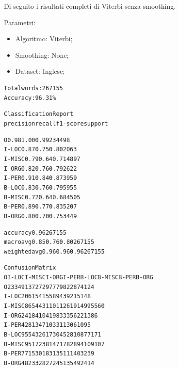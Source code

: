 \documentclass[a4paper,11pt,notitlepage]{report}
\begin{document}
Di seguito i risultati completi di Viterbi senza smoothing.

\newpage
\noindent Parametri:
\begin{itemize}
 \item Algoritmo: Viterbi;
 \item Smoothing: None;
 \item Dataset: Inglese;
\end{itemize}
{\footnotesize
\begin{alltt}
Total words: 267155
Accuracy: 96.31\%

Classification Report
              precision    recall  f1-score   support

           O       0.98      1.00      0.99    234498
       I-LOC       0.87      0.75      0.80      2063
      I-MISC       0.79      0.64      0.71      4897
       I-ORG       0.82      0.76      0.79      2622
       I-PER       0.91      0.84      0.87      3959
       B-LOC       0.83      0.76      0.79      5955
      B-MISC       0.72      0.64      0.68      4505
       B-PER       0.89      0.77      0.83      5207
       B-ORG       0.80      0.70      0.75      3449

    accuracy                           0.96    267155
   macro avg       0.85      0.76      0.80    267155
weighted avg       0.96      0.96      0.96    267155

Confusion Matrix
             O   I-LOC  I-MISC   I-ORG   I-PER   B-LOC  B-MISC   B-PER   B-ORG
O       233491      37     272      97      77      98     228      74     124
I-LOC      206    1541      55      89      43      92      15      14       8
I-MISC     865      44    3110     112      61      91     499      55      60
I-ORG      241      84     104    1983      33      56      22      13      86
I-PER      428      13      47      10    3311      30       6     109       5
B-LOC      955      43      26      17      30    4528     108      77     171
B-MISC     951       7     238      14       7     178    2894     109     107
B-PER      771       5      30       1      83     135     111    4032      39
B-ORG      482       3      32      82       7     245     135      49    2414
\end{alltt}
}
\end{document}
